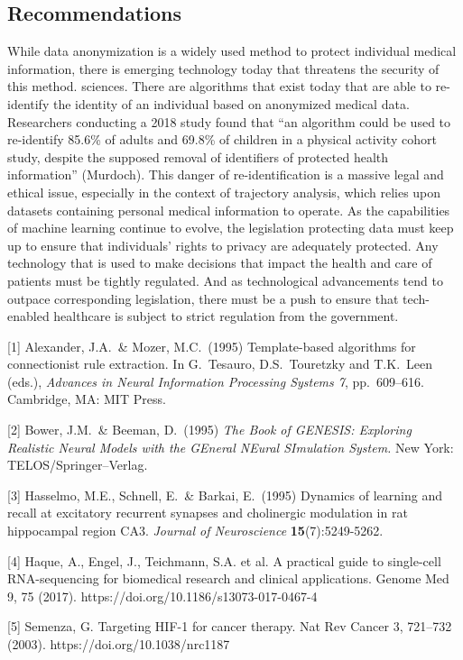 \documentclass{article}
\begin{document}
\subsection{Recommendations}
While data anonymization is a widely used method to protect individual medical information, there is emerging technology today that threatens the security of this method.  sciences.   There are algorithms that exist today that are able to re-identify the identity of an individual based on anonymized medical data. Researchers conducting a 2018 study found that “an algorithm could be used to re-identify 85.6\% of adults and 69.8\% of children in a physical activity cohort study, despite the supposed removal of identifiers of protected health information” (Murdoch).  This danger of re-identification is a massive legal and ethical issue, especially in the context of trajectory analysis, which relies upon datasets containing personal medical information to operate.  As the capabilities of machine learning continue to evolve, the legislation protecting data must keep up to ensure that individuals’ rights to privacy are adequately protected.  Any technology that is used to make decisions that impact the health and care of patients must be tightly regulated.  And as technological advancements tend to outpace corresponding legislation, there must be a push to ensure that tech-enabled healthcare is subject to strict regulation from the government.
\newpage

[1] Alexander, J.A.\ \& Mozer, M.C.\ (1995) Template-based algorithms for
connectionist rule extraction. In G.\ Tesauro, D.S.\ Touretzky and T.K.\ Leen
(eds.), {\it Advances in Neural Information Processing Systems 7},
pp.\ 609--616. Cambridge, MA: MIT Press.


[2] Bower, J.M.\ \& Beeman, D.\ (1995) {\it The Book of GENESIS: Exploring
  Realistic Neural Models with the GEneral NEural SImulation System.}  New York:
TELOS/Springer--Verlag.


[3] Hasselmo, M.E., Schnell, E.\ \& Barkai, E.\ (1995) Dynamics of learning and
recall at excitatory recurrent synapses and cholinergic modulation in rat
hippocampal region CA3. {\it Journal of Neuroscience} {\bf 15}(7):5249-5262.

[4] Haque, A., Engel, J., Teichmann, S.A. et al. A practical guide to single-cell RNA-sequencing for biomedical research and clinical applications. Genome Med 9, 75 (2017). https://doi.org/10.1186/s13073-017-0467-4

[5] Semenza, G. Targeting HIF-1 for cancer therapy. Nat Rev Cancer 3, 721–732 (2003). https://doi.org/10.1038/nrc1187
\end{document}
